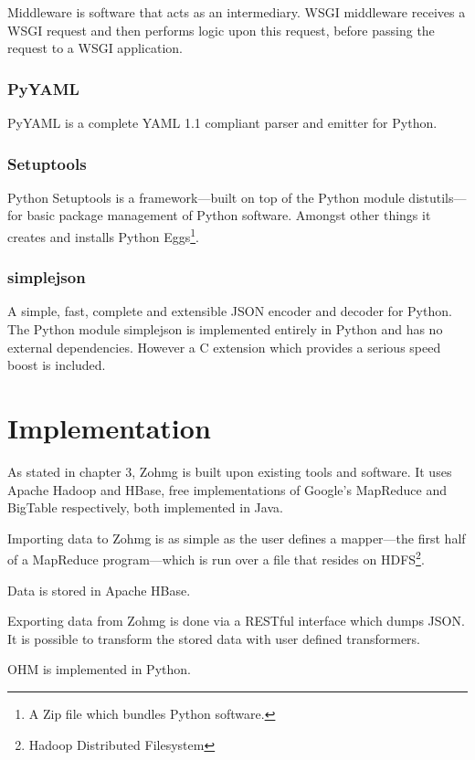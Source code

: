 \documentclass[a4paper,10pt]{book}
\begin{document}
Middleware is software that acts as an intermediary. WSGI middleware
receives a WSGI request and then performs logic upon this request, before
passing the request to a WSGI application.


\subsection{PyYAML}

PyYAML is a complete YAML 1.1 compliant parser and emitter for Python.


\subsection{Setuptools}

Python Setuptools is a framework---built on top of the Python module
distutils---for basic package management of Python software. Amongst other
things it creates and installs Python Eggs\footnote{A Zip file which
bundles Python software.}.


\subsection{simplejson}

A simple, fast, complete and extensible JSON encoder and decoder for
Python. The Python module simplejson is implemented entirely in Python and
has no external dependencies. However a C extension which provides a
serious speed boost is included.



\chapter{Implementation}

As stated in chapter 3, Zohmg is built upon existing tools and software. It
uses Apache Hadoop and HBase, free implementations of Google's MapReduce
and BigTable respectively, both implemented in Java.

Importing data to Zohmg is as simple as the user defines a mapper---the
first half of a MapReduce program---which is run over a file that resides
on HDFS\footnote{Hadoop Distributed Filesystem}.

Data is stored in Apache HBase.

Exporting data from Zohmg is done via a RESTful interface which dumps JSON.
It is possible to transform the stored data with user defined transformers.

OHM is implemented in Python.
\end{document}
